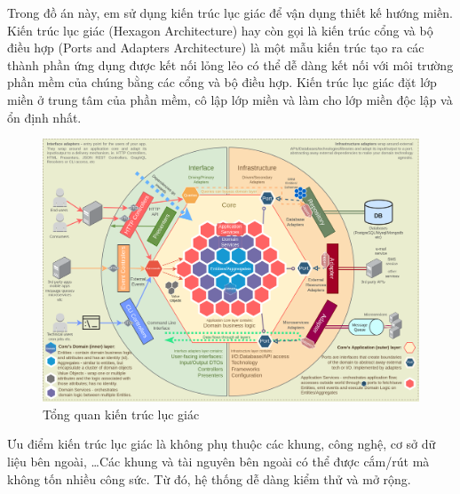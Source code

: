 Trong đồ án này, em sử dụng kiến trúc lục giác để vận dụng thiết kế hướng miền. Kiến trúc lục giác (Hexagon Architecture) hay còn gọi là kiến trúc cổng và bộ điều hợp (Ports and Adapters Architecture) là một mẫu kiến trúc tạo ra các thành phần ứng dụng được kết nối lỏng lẻo có thể dễ dàng kết nối với môi trường phần mềm của chúng bằng các cổng và bộ điều hợp. Kiến trúc lục giác đặt lớp miền ở trung tâm của phần mềm, cô lập lớp miền và làm cho lớp miền độc lập và ổn định nhất.

\begin{figure}[H]

    \centering

    \includegraphics[scale = 0.4]{pictures/_tong_quan_kien_truc_luc_giac/DomainDrivenHexagon.png}

    \caption{Tổng quan kiến trúc lục giác}

\end{figure}
\newpage
Ưu điểm   kiến trúc lục giác là không phụ thuộc   các khung, công nghệ, cơ sở dữ liệu bên ngoài, \dots Các khung và tài nguyên bên ngoài có thể được cắm/rút mà không tốn nhiều công sức. Từ đó, hệ thống dễ dàng kiểm thử và mở rộng.



